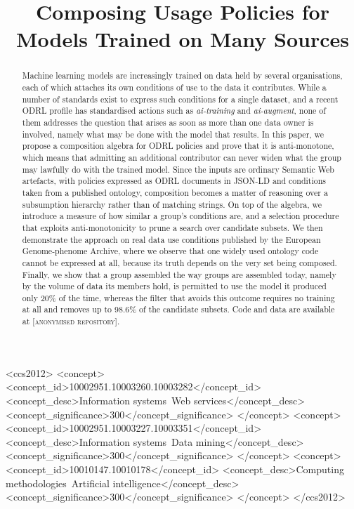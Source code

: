 \documentclass[sigconf,anonymous,review]{acmart}
\newcommand{\repourl}{\textsc{[anonymised repository]}}
\begin{document}
\title{Composing Usage Policies for Models Trained on Many Sources}

\begin{abstract}
Machine learning models are increasingly trained on data held by several
organisations, each of which attaches its own conditions of use to the data it
contributes. While a number of standards exist to express such conditions for a
single dataset, and a recent ODRL profile has standardised actions such as
\emph{ai-training} and \emph{ai-augment}, none of them addresses the question
that arises as soon as more than one data owner is involved, namely what may be
done with the model that results. In this paper, we propose a composition
algebra for ODRL policies and prove that it is anti-monotone, which means that
admitting an additional contributor can never widen what the group may lawfully
do with the trained model. Since the inputs are ordinary Semantic Web artefacts,
with policies expressed as ODRL documents in JSON-LD and conditions taken from a
published ontology, composition becomes a matter of reasoning over a subsumption
hierarchy rather than of matching strings. On top of the algebra, we introduce a
measure of how similar a group's conditions are, and a selection procedure that
exploits anti-monotonicity to prune a search over candidate subsets. We then
demonstrate the approach on real data use conditions published by the European
Genome-phenome Archive, where we observe that one widely used ontology code
cannot be expressed at all, because its truth depends on the very set being
composed. Finally, we show that a group assembled the way groups are assembled
today, namely by the volume of data its members hold, is permitted to use the
model it produced only 20\% of the time, whereas the filter that avoids this
outcome requires no training at all and removes up to 98.6\% of the candidate
subsets. Code and data are available at \repourl.
\end{abstract}

\begin{CCSXML}
<ccs2012>
<concept>
<concept_id>10002951.10003260.10003282</concept_id>
<concept_desc>Information systems~Web services</concept_desc>
<concept_significance>300</concept_significance>
</concept>
<concept>
<concept_id>10002951.10003227.10003351</concept_id>
<concept_desc>Information systems~Data mining</concept_desc>
<concept_significance>300</concept_significance>
</concept>
<concept>
<concept_id>10010147.10010178</concept_id>
<concept_desc>Computing methodologies~Artificial intelligence</concept_desc>
<concept_significance>300</concept_significance>
</concept>
</ccs2012>
\end{CCSXML}
\end{document}
